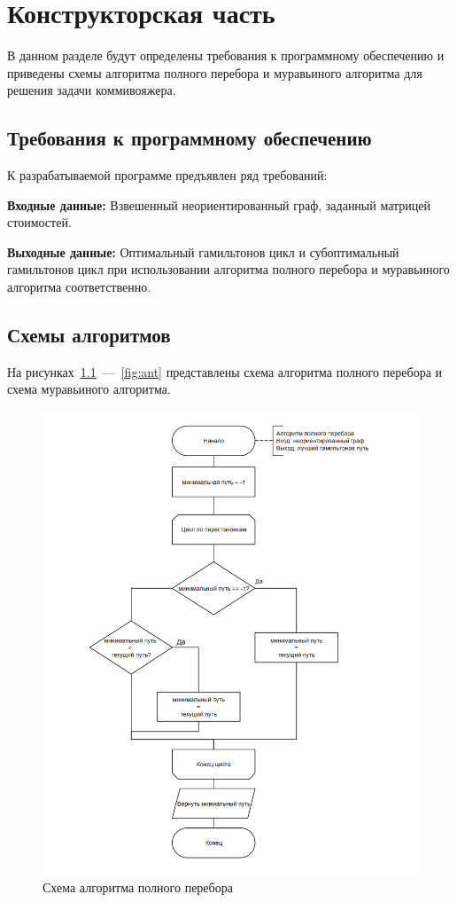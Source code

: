\chapter{Конструкторская часть}

В данном разделе будут определены требования к программному обеспечению и приведены схемы алгоритма полного перебора и муравьиного алгоритма для решения задачи коммивояжера.

\section{Требования к программному обеспечению}

К разрабатываемой программе предъявлен ряд требований:

\textbf{Входные данные:} Взвешенный неориентированный граф, заданный матрицей стоимостей.

\textbf{Выходные данные:} Оптимальный гамильтонов цикл и субоптимальный гамильтонов цикл при использовании алгоритма полного перебора и муравьиного алгоритма соответственно.

\section{Схемы алгоритмов}

На рисунках~\ref{fig:brute_force}~---~\ref{fig:ant} представлены схема алгоритма полного перебора и схема муравьиного алгоритма.

\begin{figure}[H]
    \centering
    \includegraphics[width=1\linewidth]{images/schemes/brute_force.png}
    \caption{Схема алгоритма полного перебора}
    \label{fig:brute_force}
\end{figure}

